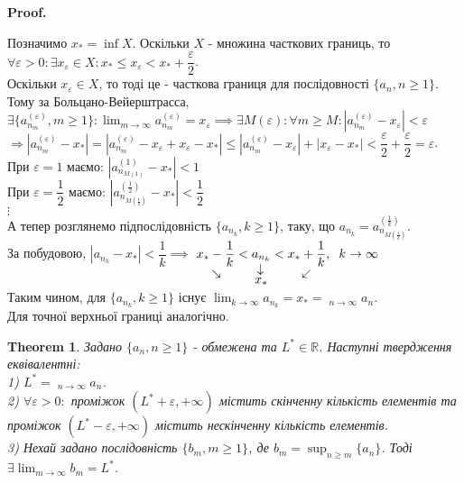 \documentclass[a4paper, 14pt]{article}
\makeatletter
\DeclareMathOperator*\uplim{\overline{lim}}
\DeclareMathOperator*\downlim{\underline{lim}}
\def\qed{$\blacksquare$}
\theoremstyle{theoremdd}
\newtheorem{theorem}{Theorem}[subsection]
\theoremstyle{theoremdd}
\theoremstyle{theoremdd}
\theoremstyle{theoremdd}
\theoremstyle{theoremdd}
\theoremstyle{theoremdd}
\theoremstyle{theoremdd}
\theoremstyle{theoremdd}
\renewenvironment{proof}[1][Proof.\\]{\par
\pushQED{\hfill \qed}%
\normalfont \topsep6\p@\@plus6\p@\relax
\trivlist
\item\relax
{\bfseries
#1\@addpunct{.}}\hspace\labelsep\ignorespaces
}{%
\popQED\endtrivlist\@endpefalse
}
\makeatother
\begin{document}
	\begin{proof}
	Позначимо $x_* = \inf X$. Оскільки $X$ - множина часткових границь, то\\
	$\forall \varepsilon > 0: \exists x_{\varepsilon} \in X: x_* \leq x_{\varepsilon} < x_* + \dfrac{\varepsilon}{2}$.\\
	Оскільки $x_\varepsilon \in X$, то тоді це - часткова границя для послідовності $\{a_n, n \geq 1\}$. Тому за Больцано-Вейерштрасса, $\exists \{a_{n_m}^{(\varepsilon)}, m \geq 1\}: \displaystyle \lim_{m \to \infty} a_{n_m}^{(\varepsilon)} = x_{\varepsilon} \implies \exists M(\varepsilon): \forall m \geq M: |a_{n_m}^{(\varepsilon)} - x_{\varepsilon}| < \varepsilon$\\
	$\Rightarrow |a_{n_m}^{(\varepsilon)} - x_*| = |a_{n_m}^{(\varepsilon)} - x_{\varepsilon} + x_{\varepsilon} - x_*| \leq |a_{n_m}^{(\varepsilon)} - x_{\varepsilon}| + |x_{\varepsilon} - x_*| < \dfrac{\varepsilon}{2} + \dfrac{\varepsilon}{2} = \varepsilon$.\\
	При $\varepsilon = 1$ маємо: $|a_{n_{M(1)}}^{(1)} - x_*| < 1$\\
	При $\varepsilon = \dfrac{1}{2}$ маємо: $|a_{n_{M(\frac{1}{2})}}^{(\frac{1}{2})} - x_*| < \dfrac{1}{2}$\\
	$\vdots$\\
	А тепер розглянемо підпослідовність $\{a_{n_k}, k \geq 1\}$, таку, що $a_{n_k} = a_{n_{M(\frac{1}{k})}}^{(\frac{1}{k})}$.\\
	За побудовою, $|a_{n_k} - x_*| < \dfrac{1}{k} \implies$ $\displaystyle \underset{\rotatebox[origin=c]{-45}{$\rightarrow$}}{x_*-\frac{1}{k}} < \underset{\underset{\displaystyle x_*}{\rotatebox[origin=c]{90}{$\leftarrow$}}}{a_{n_k}} < \underset{\rotatebox[origin=c]{45}{$\leftarrow$}}{x_*+\frac{1}{k}}, \hspace{0.2cm} k \to \infty$\\
	Таким чином, для $\{a_{n_k}, k \geq 1\}$ існує $\displaystyle \lim_{k \to \infty} a_{n_k} = x_* = \downlim_{n \to \infty} a_n$.
	\bigskip \\
	Для точної верхньої границі аналогічно.
	\end{proof}
	
	\begin{theorem}
	Задано $\{a_n, n \geq 1\}$ - обмежена та $L^* \in \mathbb{R}$. Наступні твердження еквівалентні:\\
	1) $L^* = \displaystyle \uplim_{n \to \infty} a_n$.\\
	2) $\forall \varepsilon > 0:$ проміжок $(L^*+\varepsilon, + \infty)$ містить скінченну кількість елементів та проміжок $(L^*-\varepsilon, + \infty)$ містить нескінченну кількість елементів.\\
	3) Нехай задано послідовність $\{b_m, m \geq 1\}$, де $b_m = \displaystyle \sup_{n \geq m} \{a_n\}$. Тоді $\exists \displaystyle \lim_{m \to \infty} b_m = L^*$.
	\end{theorem}
	
\end{document}
